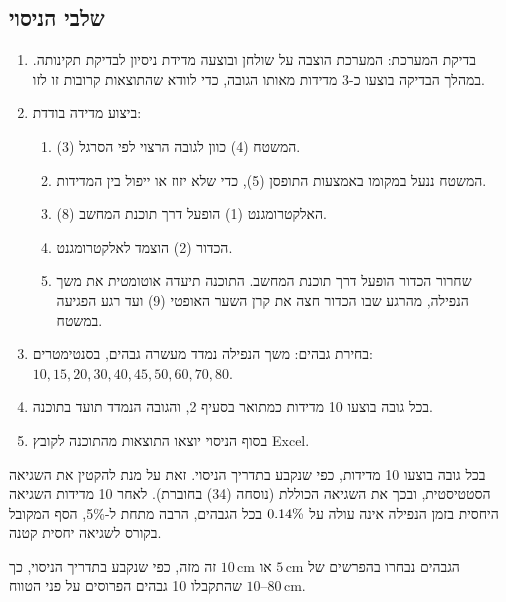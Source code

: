 \documentclass[10pt,a4paper]{article}
\newcommand{\textenglish}[1]{\foreignlanguage{english}{#1}}
\newcommand{\added}[1]{\textcolor{addedblue}{#1}}
\newcommand{\partner}[1]{\textcolor{partnergreen}{#1}}
\newcommand{\U}[1]{\,\mathrm{#1}}
\begin{document}
\subsection*{שלבי הניסוי}
\begin{enumerate}
  \item בדיקת המערכת: המערכת הוצבה על שולחן ובוצעה מדידת ניסיון לבדיקת תקינותה. במהלך הבדיקה בוצעו כ-3 מדידות מאותו הגובה, כדי לוודא שהתוצאות קרובות זו לזו.
  \item ביצוע מדידה בודדת:
  \begin{enumerate}
    \item המשטח (4) כוון לגובה הרצוי לפי הסרגל (3).
    \item המשטח ננעל במקומו באמצעות התופסן (5), כדי שלא יזוז או ייפול בין המדידות.
    \item האלקטרומגנט (1) הופעל דרך תוכנת המחשב (8).
    \item הכדור (2) הוצמד לאלקטרומגנט.
    \item שחרור הכדור הופעל דרך תוכנת המחשב. התוכנה תיעדה אוטומטית את משך הנפילה, \added{מהרגע שבו הכדור חצה את קרן השער האופטי (9)} ועד רגע הפגיעה במשטח.
  \end{enumerate}
  \item בחירת גבהים: משך הנפילה נמדד מעשרה גבהים, בסנטימטרים: $10, 15, 20, 30, 40, 45, 50, 60, 70, 80$.
  \item בכל גובה בוצעו 10 מדידות כמתואר בסעיף 2, והגובה הנמדד תועד בתוכנה.
  \item בסוף הניסוי יוצאו התוצאות מהתוכנה לקובץ \textenglish{Excel}.
\end{enumerate}
\added{בכל גובה בוצעו 10 מדידות, כפי שנקבע בתדריך הניסוי.} \partner{זאת על מנת להקטין את השגיאה הסטטיסטית, ובכך את השגיאה הכוללת} \added{(נוסחה (34) בחוברת). לאחר 10 מדידות השגיאה היחסית בזמן הנפילה אינה עולה על $0.14\%$ בכל הגבהים, הרבה מתחת ל-5\%}\partner{, הסף המקובל בקורס לשגיאה יחסית קטנה}\added{.}

\added{הגבהים נבחרו בהפרשים של} \partner{$5\U{cm}$} \added{או $10\U{cm}$ זה מזה, כפי שנקבע בתדריך הניסוי, כך שהתקבלו 10 גבהים הפרוסים על פני הטווח $10\text{--}80\U{cm}$.}
\end{document}
